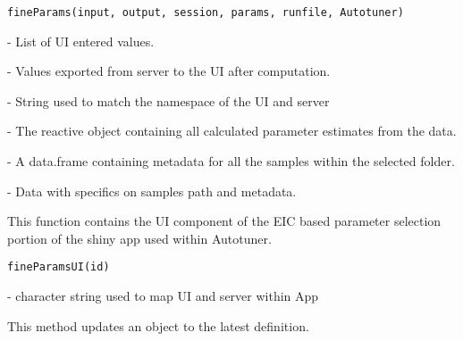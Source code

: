 \documentclass[a4paper]{book}
\begin{document}
%
\begin{Usage}
\begin{verbatim}
fineParams(input, output, session, params, runfile, Autotuner)
\end{verbatim}
\end{Usage}
%
\begin{Arguments}
\begin{ldescription}
\item[\code{input}] - List of UI entered values.

\item[\code{output}] - Values exported from server to the UI after computation.

\item[\code{session}] - String used to match the namespace of the UI and server

\item[\code{params}] - The reactive object containing all calculated parameter
estimates from the data.

\item[\code{runfile}] - A data.frame containing metadata for all the samples within
the selected folder.

\item[\code{Autotuner}] - Data with specifics on samples path and metadata.
\end{ldescription}
\end{Arguments}
%
\begin{Description}\relax
This function contains the UI component of the EIC based
parameter selection portion of the shiny app used within Autotuner.
\end{Description}
%
\begin{Usage}
\begin{verbatim}
fineParamsUI(id)
\end{verbatim}
\end{Usage}
%
\begin{Arguments}
\begin{ldescription}
\item[\code{id}] - character string used to map UI and server within App
\end{ldescription}
\end{Arguments}
%
\begin{Description}\relax
This method updates an 
object to the latest definition.
\end{Description}
\end{document}

